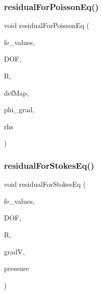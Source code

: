 \mbox{\label{class_residual_ada0899a86c88ceb84cc3c1155663b8ba}} 
\subsubsection{\texorpdfstring{residualForPoissonEq()}{residualForPoissonEq()}\hspace{0.1cm}{\footnotesize\ttfamily [4/4]}}
{\footnotesize\ttfamily void residual\+For\+Poisson\+Eq (\begin{DoxyParamCaption}\item[{const F\+E\+Values$<$ dim $>$ \&}]{fe\+\_\+values,  }\item[{unsigned int}]{D\+OF,  }\item[{dealii\+::\+Table$<$ 1, T $>$ \&}]{R,  }\item[{\mbox{\hyperlink{structdeformation_map}{deformation\+Map}}$<$ T, dim $>$ \&}]{def\+Map,  }\item[{dealii\+::\+Table$<$ 3, T $>$ \&}]{phi\+\_\+grad,  }\item[{dealii\+::\+Table$<$ 2, T $>$ \&}]{rhs }\end{DoxyParamCaption})}

\mbox{\label{class_residual_a9a8f493fb66e0bd394948af13a27d821}} 
\subsubsection{\texorpdfstring{residualForStokesEq()}{residualForStokesEq()}\hspace{0.1cm}{\footnotesize\ttfamily [1/2]}}
{\footnotesize\ttfamily void residual\+For\+Stokes\+Eq (\begin{DoxyParamCaption}\item[{const F\+E\+Values$<$ dim $>$ \&}]{fe\+\_\+values,  }\item[{unsigned int}]{D\+OF,  }\item[{Table$<$ 1, T $>$ \&}]{R,  }\item[{Table$<$ 3, T $>$ \&}]{gradV,  }\item[{dealii\+::\+Table$<$ 1, T $>$ \&}]{pressure }\end{DoxyParamCaption})}

